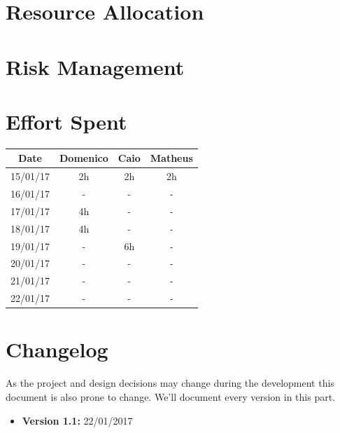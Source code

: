 \documentclass[a4paper]{article}
\begin{document}
\section{Resource Allocation}
\section{Risk Management}

\newpage
\section{Effort Spent}
\begin{tabular}{ | c | c | c | c | }
\hline
	\textbf {Date} & \textbf {Domenico} & \textbf {Caio} & \textbf {Matheus} \\ \hline
	15/01/17& 2h & 2h & 2h  \\ \hline
	16/01/17& - & - & - \\ \hline
	17/01/17& 4h & - & - \\ \hline
	18/01/17& 4h & - & - \\ \hline
	19/01/17& - & 6h & - \\ \hline
	20/01/17& - & - & - \\ \hline
	21/01/17& - & - & - \\ \hline
	22/01/17& - & - & - \\ \hline
\end{tabular}
\newpage

\section{Changelog}
As the project and design decisions may change during the development this document is also prone to change.
We'll document every version in this part.
\begin{itemize}
\item \textbf {Version 1.1:} 22/01/2017
\end{itemize}
\end{document}
